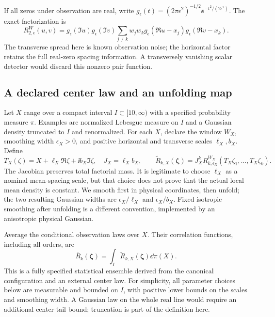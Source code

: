 If all zeros under observation are real, write
$g_\epsilon(t)=(2\pi\epsilon^2)^{-1/2}\ee^{-t^2/(2\epsilon^2)}$.
The exact factorization is
\begin{equation}\label{eq:real-zero-correlation}
 R_{2,\epsilon}^W(u,v)
 =g_\epsilon(\Im u)g_\epsilon(\Im v)
   \sum_{j\ne k}w_jw_k
        g_\epsilon(\Re u-x_j)g_\epsilon(\Re v-x_k).
\end{equation}
The transverse spread here is known observation noise; the horizontal
factor retains the full real-zero spacing information. A transversely
vanishing scalar detector would discard this nonzero pair function.

\subsection{A declared center law and an unfolding map}

Let $X$ range over a compact interval $I\subset[10,\infty)$ with a
specified probability measure $\pi$. Examples are normalized Lebesgue
measure on $I$ and a Gaussian density truncated to $I$ and renormalized.
For each $X$, declare the window $W_X$, smoothing width $\epsilon_X>0$,
and positive horizontal and transverse scales $\ell_X,b_X$. Define
\begin{equation}\label{eq:unfolding}
 T_X(\zeta)=X+\ell_X\Re\zeta+\ii b_X\Im\zeta,
 \quad J_X=\ell_X b_X,\qquad
 \widetilde R_{k,X}(\boldsymbol\zeta)
   =J_X^kR_{k,\epsilon_X}^{W_X}(T_X\zeta_1,\ldots,T_X\zeta_k).
\end{equation}
The Jacobian preserves total factorial mass. It is legitimate to choose
$\ell_X$ as a nominal mean-spacing scale, but that choice does not
prove that the actual local mean density is constant. We smooth first
in physical coordinates, then unfold; the two resulting Gaussian widths
are $\epsilon_X/\ell_X$ and $\epsilon_X/b_X$. Fixed isotropic smoothing
after unfolding is a different convention, implemented by an anisotropic
physical Gaussian.

Average the conditional observation laws over $X$. Their correlation
functions, including all orders, are
\begin{equation}\label{eq:center-average}
 \overline R_k(\boldsymbol\zeta)
       =\int_I\widetilde R_{k,X}(\boldsymbol\zeta)\dd\pi(X).
\end{equation}
This is a fully specified statistical ensemble derived from the
canonical configuration and an external center law. For simplicity,
all parameter choices below are measurable and bounded on $I$, with
positive lower bounds on the scales and smoothing width. A Gaussian
law on the whole real line would require an additional center-tail
bound; truncation is part of the definition here.

